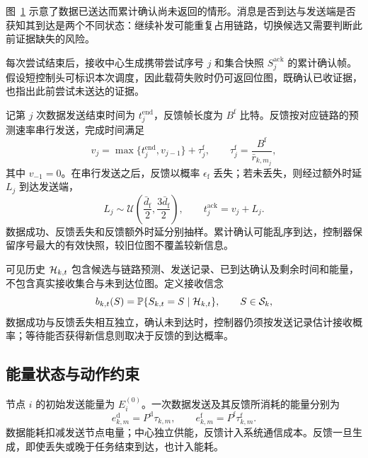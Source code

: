 图~\ref{rq3:fig:delivery-scene} 示意了数据已送达而累计确认尚未返回的情形。消息是否到达与发送端是否获知其到达是两个不同状态：继续补发可能重复占用链路，切换候选又需要判断此前证据缺失的风险。

\begin{figure}[htbp]
\centering

\label{rq3:fig:delivery-scene}
\end{figure}

每次尝试结束后，接收中心生成携带尝试序号 $j$ 和集合快照 $S_j^{\mathrm{ack}}$ 的累计确认帧。假设短控制头可标识本次调度，因此载荷失败时仍可返回位图，既确认已收证据，也指出此前尝试未送达的证据。

记第 $j$ 次数据发送结束时间为 $t_j^{\mathrm{end}}$，反馈帧长度为 $B^{\mathrm f}$ 比特。反馈按对应链路的预测速率串行发送，完成时间满足
\begin{equation}
  v_j=\max\{t_j^{\mathrm{end}},v_{j-1}\}+\tau_j^{\mathrm f},
  \qquad \tau_j^{\mathrm f}=\frac{B^{\mathrm f}}{\bar r_{k,m_j}},
  \label{rq3:eq:feedback-serialization}
\end{equation}
其中 $v_{-1}=0$。在串行发送之后，反馈以概率 $\epsilon_{\mathrm f}$ 丢失；若未丢失，则经过额外时延 $L_j$ 到达发送端，
\begin{equation}
  L_j\sim\mathcal{U}\left(\frac{\bar d_{\mathrm f}}{2},\frac{3\bar d_{\mathrm f}}{2}\right),
  \qquad t_j^{\mathrm{ack}}=v_j+L_j.
  \label{rq3:eq:feedback-delay}
\end{equation}
数据成功、反馈丢失和反馈额外时延分别抽样。累计确认可能乱序到达，控制器保留序号最大的有效快照，较旧位图不覆盖较新信息。

可见历史 $\mathcal{H}_{k,t}$ 包含候选与链路预测、发送记录、已到达确认及剩余时间和能量，不包含真实接收集合与未到达位图。定义接收信念
\begin{equation}
  b_{k,t}(S)=\mathbb{P}\{S_{k,t}=S\mid\mathcal{H}_{k,t}\},\qquad S\in\mathcal{S}_k,
  \label{rq3:eq:belief-definition}
\end{equation}
数据成功与反馈丢失相互独立，确认未到达时，控制器仍须按发送记录估计接收概率；等待能否获得新信息则取决于反馈的到达概率。

\subsection{能量状态与动作约束}
\label{rq3:subsec:energy}

节点 $i$ 的初始发送能量为 $E_i^{(0)}$。一次数据发送及其反馈所消耗的能量分别为
\begin{equation}
  e_{k,m}^{\mathrm d}=P^{\mathrm d}\tau_{k,m},\qquad
  e_{k,m}^{\mathrm f}=P^{\mathrm f}\tau_{k,m}^{\mathrm f}.
  \label{rq3:eq:transmit-energy}
\end{equation}
数据能耗扣减发送节点电量；中心独立供能，反馈计入系统通信成本。反馈一旦生成，即使丢失或晚于任务结束到达，也计入能耗。

